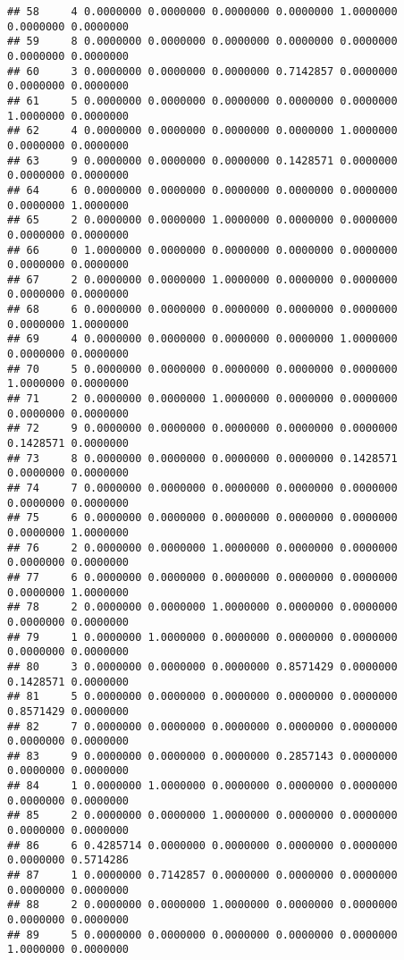 \documentclass[
]{article}
\begin{document}
\begin{verbatim}
## 58     4 0.0000000 0.0000000 0.0000000 0.0000000 1.0000000 0.0000000 0.0000000
## 59     8 0.0000000 0.0000000 0.0000000 0.0000000 0.0000000 0.0000000 0.0000000
## 60     3 0.0000000 0.0000000 0.0000000 0.7142857 0.0000000 0.0000000 0.0000000
## 61     5 0.0000000 0.0000000 0.0000000 0.0000000 0.0000000 1.0000000 0.0000000
## 62     4 0.0000000 0.0000000 0.0000000 0.0000000 1.0000000 0.0000000 0.0000000
## 63     9 0.0000000 0.0000000 0.0000000 0.1428571 0.0000000 0.0000000 0.0000000
## 64     6 0.0000000 0.0000000 0.0000000 0.0000000 0.0000000 0.0000000 1.0000000
## 65     2 0.0000000 0.0000000 1.0000000 0.0000000 0.0000000 0.0000000 0.0000000
## 66     0 1.0000000 0.0000000 0.0000000 0.0000000 0.0000000 0.0000000 0.0000000
## 67     2 0.0000000 0.0000000 1.0000000 0.0000000 0.0000000 0.0000000 0.0000000
## 68     6 0.0000000 0.0000000 0.0000000 0.0000000 0.0000000 0.0000000 1.0000000
## 69     4 0.0000000 0.0000000 0.0000000 0.0000000 1.0000000 0.0000000 0.0000000
## 70     5 0.0000000 0.0000000 0.0000000 0.0000000 0.0000000 1.0000000 0.0000000
## 71     2 0.0000000 0.0000000 1.0000000 0.0000000 0.0000000 0.0000000 0.0000000
## 72     9 0.0000000 0.0000000 0.0000000 0.0000000 0.0000000 0.1428571 0.0000000
## 73     8 0.0000000 0.0000000 0.0000000 0.0000000 0.1428571 0.0000000 0.0000000
## 74     7 0.0000000 0.0000000 0.0000000 0.0000000 0.0000000 0.0000000 0.0000000
## 75     6 0.0000000 0.0000000 0.0000000 0.0000000 0.0000000 0.0000000 1.0000000
## 76     2 0.0000000 0.0000000 1.0000000 0.0000000 0.0000000 0.0000000 0.0000000
## 77     6 0.0000000 0.0000000 0.0000000 0.0000000 0.0000000 0.0000000 1.0000000
## 78     2 0.0000000 0.0000000 1.0000000 0.0000000 0.0000000 0.0000000 0.0000000
## 79     1 0.0000000 1.0000000 0.0000000 0.0000000 0.0000000 0.0000000 0.0000000
## 80     3 0.0000000 0.0000000 0.0000000 0.8571429 0.0000000 0.1428571 0.0000000
## 81     5 0.0000000 0.0000000 0.0000000 0.0000000 0.0000000 0.8571429 0.0000000
## 82     7 0.0000000 0.0000000 0.0000000 0.0000000 0.0000000 0.0000000 0.0000000
## 83     9 0.0000000 0.0000000 0.0000000 0.2857143 0.0000000 0.0000000 0.0000000
## 84     1 0.0000000 1.0000000 0.0000000 0.0000000 0.0000000 0.0000000 0.0000000
## 85     2 0.0000000 0.0000000 1.0000000 0.0000000 0.0000000 0.0000000 0.0000000
## 86     6 0.4285714 0.0000000 0.0000000 0.0000000 0.0000000 0.0000000 0.5714286
## 87     1 0.0000000 0.7142857 0.0000000 0.0000000 0.0000000 0.0000000 0.0000000
## 88     2 0.0000000 0.0000000 1.0000000 0.0000000 0.0000000 0.0000000 0.0000000
## 89     5 0.0000000 0.0000000 0.0000000 0.0000000 0.0000000 1.0000000 0.0000000

\end{verbatim}
\end{document}
